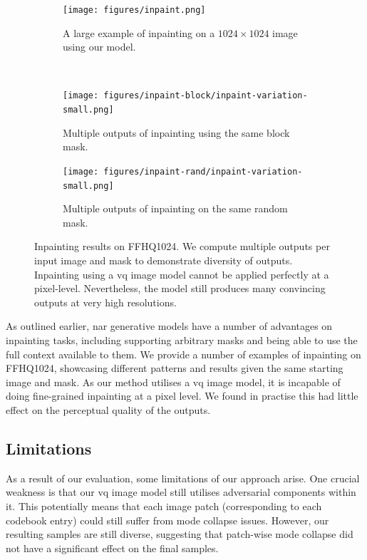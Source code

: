 \begin{figure}[h]
    \centering
    \begin{subfigure}[b]{\textwidth}
        \centering
        \label{fig:inpaintExample}
        \texttt{[image: figures/inpaint.png]}
        \caption{A large example of inpainting on a $1024 \times 1024$ image using our
        model.}
    \end{subfigure}
    \\
    \begin{subfigure}[b]{0.47\textwidth}
        \centering
        \texttt{[image: figures/inpaint-block/inpaint-variation-small.png]}
        \caption{
            Multiple outputs of inpainting using the same block mask.
        }
    \end{subfigure}
    \hfill
    \begin{subfigure}[b]{0.47\textwidth}
        \centering
        \texttt{[image: figures/inpaint-rand/inpaint-variation-small.png]}
        \caption{
            Multiple outputs of inpainting on the same random mask. 
        }
    \end{subfigure}
    \caption{
        Inpainting results on FFHQ1024. We compute multiple outputs per
        input image and mask to demonstrate diversity of outputs. Inpainting
        using a \gls{vq} image model cannot be applied perfectly at a
        pixel-level. Nevertheless, the model still produces many convincing
        outputs at very high resolutions.
    }
\end{figure}

As outlined earlier, \acrlong{nar} generative models have a number of advantages
on inpainting tasks, including supporting arbitrary masks and being able to use
the full context available to them. We provide a number of examples of
inpainting on FFHQ1024, showcasing different patterns and results given the same
starting image and mask. As our method utilises a \gls{vq} image model, it is
incapable of doing fine-grained inpainting at a pixel level. We found in
practise this had little effect on the perceptual quality of the outputs.

\subsection{Limitations}
\label{subsec:evaluationLimitation}

As a result of our evaluation, some limitations of our approach arise. One
crucial weakness is that our \gls{vq} image model still utilises adversarial
components within it. This potentially means that each image patch
(corresponding to each codebook entry) could still suffer from mode collapse
issues. However, our resulting samples are still diverse, suggesting that
patch-wise mode collapse did not have a significant effect on the final samples.

